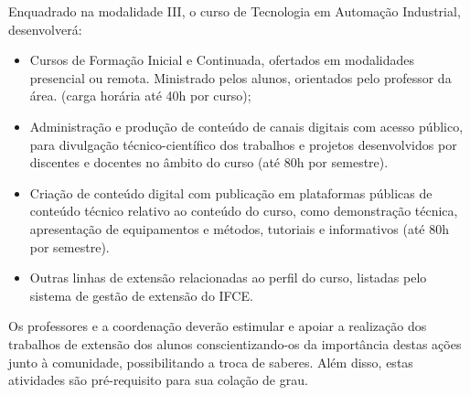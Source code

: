 
Enquadrado na modalidade III, o curso de Tecnologia em Automação Industrial, desenvolverá:\\

\begin{itemize}
\item Cursos de Formação Inicial e Continuada, ofertados em modalidades presencial ou remota. Ministrado pelos alunos, orientados pelo professor da área. (carga horária até 40h por curso);
\item Administração e produção de conteúdo de canais digitais com acesso público, para divulgação técnico-científico dos trabalhos e projetos desenvolvidos por discentes e docentes no âmbito do curso (até 80h por semestre).
\item Criação de conteúdo digital com publicação em plataformas públicas de conteúdo técnico relativo ao conteúdo do curso, como demonstração técnica, apresentação de equipamentos e métodos, tutoriais e informativos (até 80h por semestre).
\item Outras linhas de extensão relacionadas ao perfil do curso, listadas pelo sistema de gestão de extensão do IFCE.
\end{itemize}

Os professores e a coordenação deverão estimular e apoiar a realização dos trabalhos de extensão dos alunos conscientizando-os da importância destas ações junto à comunidade, possibilitando a troca de saberes. Além disso, estas atividades são pré-requisito para sua colação de grau.\\

